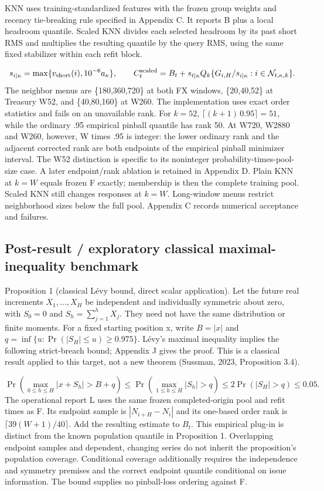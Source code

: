 \documentclass[10pt,a4paper]{article}
\begin{document}
KNN uses training-standardized features with the frozen group weights and recency tie-breaking rule specified in Appendix C. It reports B plus a local headroom quantile. Scaled KNN divides each selected headroom by its past short RMS and multiplies the resulting quantile by the query RMS, using the same fixed stabilizer within each refit block.

\[
s_{i\mid \kappa}=\max\{v_{\rm short}(i),10^{-6}a_\kappa\},\qquad C_t^{\rm scaled}=B_t+s_{t\mid \kappa}Q_k\{G_{i,H}/s_{i\mid \kappa}:i\in\mathcal N_{t,\kappa,k}\}.
\]
The neighbor menus are \{180,360,720\} at both FX windows, \{20,40,52\} at Treasury W52, and \{40,80,160\} at W260. The implementation uses exact order statistics and fails on an unavailable rank. For \(k=52\), \(\lceil(k+1)\,0.95\rceil=51\), while the ordinary .95 empirical pinball quantile has rank 50. At W720, W2880 and W260, however, W times .95 is integer: the lower ordinary rank and the adjacent corrected rank are both endpoints of the empirical pinball minimizer interval. The W52 distinction is specific to its noninteger probability-times-pool-size case. A later endpoint/rank ablation is retained in Appendix D. Plain KNN at \(k=W\) equals frozen F exactly; membership is then the complete training pool. Scaled KNN still changes responses at \(k=W\). Long-window menus restrict neighborhood sizes below the full pool. Appendix C records numerical acceptance and failures.

\subsection*{Post-result / exploratory classical maximal-inequality benchmark}
Proposition 1 (classical Lévy bound, direct scalar application). Let the future real increments \(X_1,\ldots,X_H\) be independent and individually symmetric about zero, with \(S_0=0\) and \(S_h=\sum_{j=1}^{h}X_j\). They need not have the same distribution or finite moments. For a fixed starting position x, write \(B=|x|\) and \(q=\inf\{u:\Pr(|S_H|\le u)\ge0.975\}\). Lévy's maximal inequality implies the following strict-breach bound; Appendix J gives the proof. This is a classical result applied to this target, not a new theorem (Sussman, 2023, Proposition 3.4).

\[
\Pr\!\left(\max_{0\le h\le H}|x+S_h|>B+q\right)\le\Pr\!\left(\max_{1\le h\le H}|S_h|>q\right)\le 2\Pr(|S_H|>q)\le0.05.
\]
The operational report L uses the same frozen completed-origin pool and refit times as F. Its endpoint sample is \(|N_{i+H}-N_i|\) and its one-based order rank is \(\lceil39(W+1)/40\rceil\). Add the resulting estimate to \(B_t\). This empirical plug-in is distinct from the known population quantile in Proposition 1. Overlapping endpoint samples and dependent, changing series do not inherit the proposition's population coverage. Conditional coverage additionally requires the independence and symmetry premises and the correct endpoint quantile conditional on issue information. The bound supplies no pinball-loss ordering against F.
\end{document}
